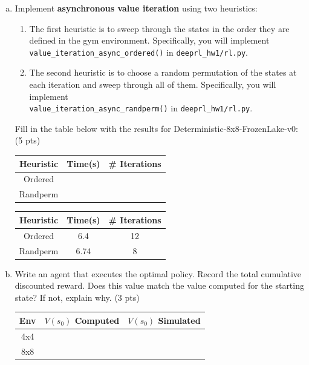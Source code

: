 \documentclass[12pt]{article}
\begin{document}
\begin{enumerate}[a)]
\item Implement \textbf{asynchronous value iteration} using two heuristics:
\begin{enumerate}[1.]
\item The first heuristic is to sweep through the states in the order they are defined in the gym environment. Specifically, you will implement\\
\texttt{value\_iteration\_async\_ordered()} in \texttt{deeprl\_hw1/rl.py}.
\item The second heuristic is to choose a random permutation of the states at each iteration and sweep through all of them.  Specifically, you will implement\\
\texttt{value\_iteration\_async\_randperm()} in \texttt{deeprl\_hw1/rl.py}.
\end{enumerate}
Fill in the table below with the results for Deterministic-8x8-FrozenLake-v0: (5 pts)

\begin{center}
  \begin{tabular}{|c|c|c|}\hline
    {\bf Heuristic} & {\bf Time(s)} & {\bf \# Iterations} \\ \hline
    Ordered & & \\ \hline
    Randperm & & \\ \hline
  \end{tabular}
\end{center}

\begin{solution}
\begin{center}
  \begin{tabular}{|c|c|c|}\hline
    {\bf Heuristic} & {\bf Time(s)} & {\bf \# Iterations} \\ \hline
    Ordered & 6.4 & 12 \\ \hline
    Randperm & 6.74 & 8 \\ \hline
  \end{tabular}
\end{center}
\end{solution}

\item Write an agent that executes the optimal policy. Record the total cumulative discounted reward. Does this value match the value computed for the starting state? If not, explain why. (3 pts)

\begin{center}
  \begin{tabular}{|c|c|c|}\hline
    {\bf Env} & {\bf $V(s_0)$ Computed} & {\bf $V(s_0)$ Simulated}  \\ \hline
    4x4  & & \\ \hline
    8x8  & & \\ \hline
  \end{tabular}
\end{center}


\end{enumerate}
\end{document}
